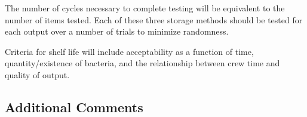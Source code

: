 The number of cycles necessary to complete testing will be equivalent to the number of items tested. Each of these three storage methods should be tested for each output over a number of trials to minimize randomness.

Criteria for shelf life will include acceptability as a function of time, quantity/existence of bacteria, and the relationship between crew time and quality of output.




\clearpage

\subsection{Additional Comments}


\clearpage

